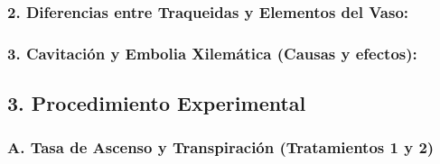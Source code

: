 \documentclass[
  spanish,
  10pt,
  letterpaper,
  twocolumn]{article}
\begin{document}
\hrulefill

\hrulefill

\hrulefill

\hrulefill

\hrulefill

\hrulefill

\subsubsection{\texorpdfstring{\textbf{2. Diferencias entre Traqueidas y
Elementos del
Vaso:}}{2. Diferencias entre Traqueidas y Elementos del Vaso:}}\label{diferencias-entre-traqueidas-y-elementos-del-vaso}

\hrulefill

\hrulefill

\hrulefill

\hrulefill

\hrulefill

\hrulefill

\subsubsection{\texorpdfstring{\textbf{3. Cavitación y Embolia
Xilemática (Causas y
efectos):}}{3. Cavitación y Embolia Xilemática (Causas y efectos):}}\label{cavitaciuxf3n-y-embolia-xilemuxe1tica-causas-y-efectos}

\hrulefill

\hrulefill

\hrulefill

\hrulefill

\hrulefill

\hrulefill

\subsection{3. Procedimiento
Experimental}\label{procedimiento-experimental}

\subsubsection{A. Tasa de Ascenso y Transpiración (Tratamientos 1 y
2)}\label{a.-tasa-de-ascenso-y-transpiraciuxf3n-tratamientos-1-y-2}
\end{document}
